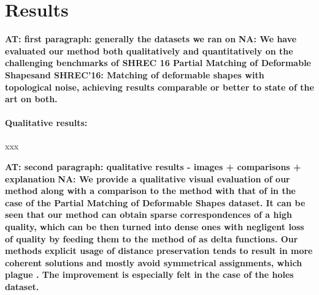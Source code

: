 \documentclass[10pt,twocolumn,letterpaper]{article}
\newcommand{\colornote}[3]{{\color{#1}\bf{#2: #3}\normalfont}}
\newcommand{\colornote}[3]{}
\newcommand {\ayellet}[1]{\colornote{blue}{AT}{#1}}
\newcommand {\nadav}[1]{\colornote{red}{NA}{#1}}
\begin{document}
\section{Results}
\label{section:results}

\ayellet{first paragraph: generally the datasets we ran on}
\nadav{We have evaluated our method both qualitatively and quantitatively on the challenging benchmarks of SHREC 16 Partial Matching of Deformable Shapes\cite{cosmo2016shrec}and SHREC’16: Matching of deformable shapes with topological noise\cite{lahner2016shrec}, achieving results comparable or better to state of the art on both.}
\paragraph{Qualitative results:} xxx

\ayellet{second paragraph: qualitative results - images + comparisons + explanation}
\nadav{We provide a qualitative visual evaluation of our method along with a comparison to the method with that of \cite{rodola2017partial} in the case of the Partial Matching of Deformable Shapes dataset. 
It can be seen that our method can obtain sparse correspondences of a high quality, which can be then turned into dense ones with negligent loss of quality by feeding them to the method of \cite{litany2017fully} as delta functions. 
Our methods explicit usage of distance preservation tends to result in more coherent solutions and mostly avoid symmetrical assignments, which plague \cite{rodola2017partial}. 
The improvement is especially felt in the case of the holes dataset.}
\end{document}
